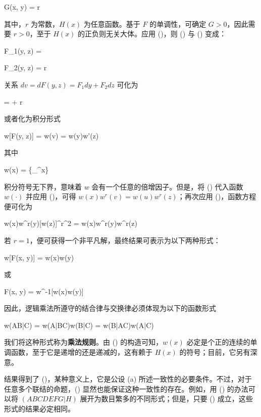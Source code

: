 \startformula
G(x, y) = r
\stopformula

其中，$r$ 为常数，$H(x)$ 为任意函数。基于 $F$ 的单调性，可确定 $G > 0$，因此需要 $r > 0$，至于 $H(x)$ 的正负则无关大体。应用 ()，则 (\in[eq-U]) 与 (\in[eq-V]) 变成：

\placeformula
\startformula
F_1(y, z) =  
\stopformula

\placeformula
\startformula
F_2(y, z) = r 
\stopformula

关系 $dv=dF(y, z)=F_1dy + F_2dz$ 可化为

\placeformula
\startformula
{} =  + r
\stopformula

或者化为积分形式

\placeformula[eq-int]
\startformula
w[F(y, z)] = w(v) = w(y)w'(z)
\stopformula

其中

\placeformula[w-func]
\startformula
w(x) = \left\{\int_{}^{x}\right\}
\stopformula

积分符号无下界，意味着 $w$ 会有一个任意的倍增因子。但是，将 (\in[eq-target]) 代入函数 $w(\cdot)$ 并应用 (\in[eq-int])，可得 $w(x)w^r(v) = w(u)w^r(z)$；再次应用 (\in[eq-int])，函数方程便可化为

\placeformula[2-25]
\startformula
w(x)w^r(y)[w(z)]^{r^2} = w(x)w^r(y)w^r(z)
\stopformula

若 $r = 1$，便可获得一个非平凡解，最终结果可表示为以下两种形式：

\placeformula
\startformula
w[F(x, y)] = w(x)w(y)
\stopformula

或

\startformula
F(x, y) = w^{-1}[w(x)w(y)]
\stopformula

因此，逻辑乘法所遵守的结合律与交换律必须体现为以下的函数形式

\startformula
w(AB|C) = w(A|BC)w(B|C) = w(B|AC)w(A|C)
\stopformula

我们将这种形式称为{\bf 乘法规则}。由 (\in[w-func]) 的构造可知，$w(x)$ 必定是个正的连续的单调函数，至于它是递增的还是递减的，这有赖于 $H(x)$ 的符号；目前，它另有深意。

结果得到了 ()，某种意义上，它是公设 (a) 所述一致性的必要条件。不过，对于任意多个联结的命题，() 显然也能保证这种一致性的存在。例如，用 () 的办法可以将 $(ABCDEFG|H)$ 展开为数目繁多的不同形式；但是，只要 () 成立，这些形式的结果必定相同。

